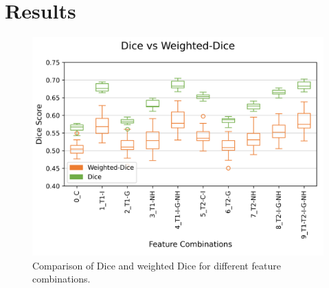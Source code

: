 \documentclass[conference]{IEEEtran}
\begin{document}


\section{Results} \label{sec:Results}

\begin{figure}[h!]
  \centering
  \includegraphics[width=0.95\linewidth, trim={0 4mm 0 10mm}, clip]{diceStuffZoomed}
  \caption{Comparison of Dice and weighted Dice for different feature combinations.}
  \label{fig:diceScore}
\end{figure}
\end{document}
